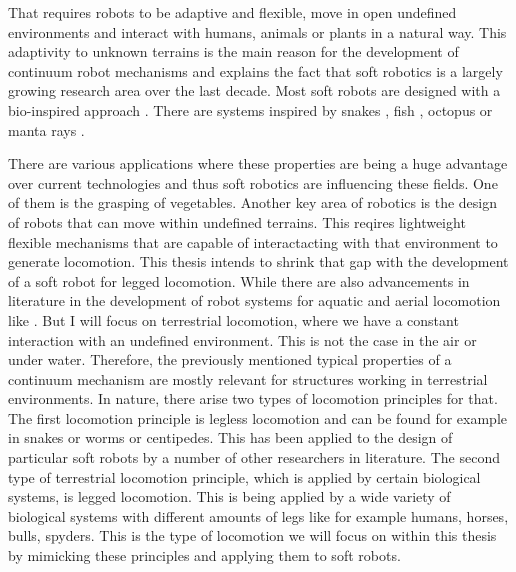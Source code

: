 That requires robots to be adaptive and flexible, move in open undefined environments and interact with humans, animals or plants in a natural way. This adaptivity to unknown terrains
is the main reason for the development of continuum robot mechanisms and explains the fact that soft robotics is a largely growing research area over the last decade.
%
Most soft robots are designed with a bio-inspired approach \cite{Kim2013,Trivedi2008}. There are systems inspired by snakes \cite{Onal2013, Qi2020, Branyan2017_conf},
 fish \cite{Hou2019_conf,Hu2020,Marchese2014}, octopus \cite{OBrien2001_conf,Neppalli2007_conf} or manta rays \cite{Suzumori2007_conf,Cai2009_conf}. \par
%
There are various applications where these properties are being a huge advantage over current technologies and thus soft robotics are influencing these fields. 
One of them is the grasping of vegetables. 
%
Another key area of robotics is the design of robots that can move within undefined terrains. This reqires lightweight flexible mechanisms that are capable of interactacting
 with that environment to generate locomotion. This thesis intends to shrink that gap with the development of a soft robot for legged locomotion. While there are also advancements
 in literature in the development of robot systems for aquatic and aerial locomotion like . But I will focus on terrestrial locomotion, where we have a constant interaction with an 
 undefined environment. This is not the case in the air or under water. Therefore, the previously mentioned typical properties of a continuum mechanism are mostly relevant for
 structures working in terrestrial environments. In nature, there arise two types of locomotion principles for that. The first locomotion principle is legless locomotion and can 
 be found for example in snakes or worms or centipedes. This has been applied to the design of particular soft robots by a number of other researchers in literature. 
 The second type of terrestrial locomotion principle, which is applied by certain biological systems, is legged locomotion. This is being applied by a wide variety of biological
 systems with different amounts of legs like for example humans, horses, bulls, spyders. This is the type of locomotion we will focus on within this thesis by mimicking these principles
 and applying them to soft robots.
%
%
%
